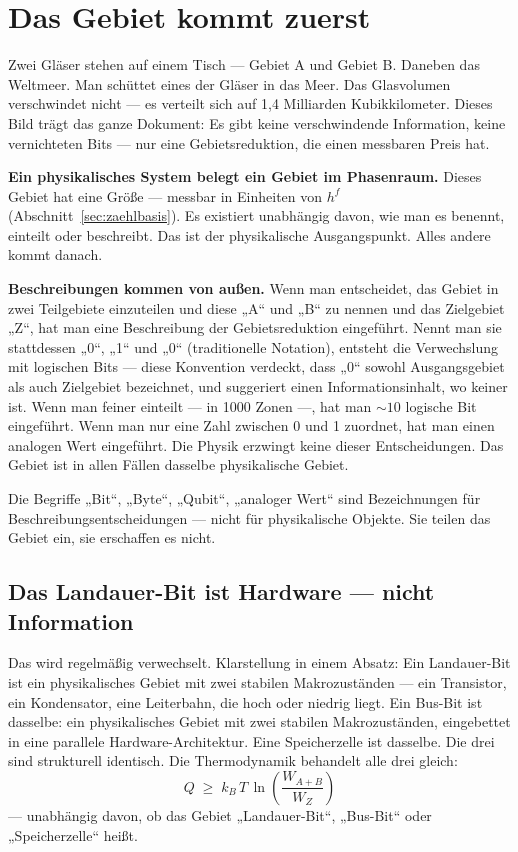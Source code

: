 \bigskip

\section{Das Gebiet kommt zuerst}

Zwei Gläser stehen auf einem Tisch --- Gebiet A und Gebiet B. Daneben das
Weltmeer. Man schüttet eines der Gläser in das Meer. Das Glasvolumen verschwindet
nicht --- es verteilt sich auf 1,4 Milliarden Kubikkilometer. Dieses Bild trägt
das ganze Dokument: Es gibt keine verschwindende Information, keine vernichteten
Bits --- nur eine Gebietsreduktion, die einen messbaren Preis hat.

\LS \textbf{Ein physikalisches System belegt ein Gebiet im Phasenraum.} Dieses
Gebiet hat eine Größe --- messbar in Einheiten von $h^f$ (Abschnitt~\ref{sec:zaehlbasis}).
Es existiert unabhängig davon, wie man es benennt, einteilt oder beschreibt. Das
ist der physikalische Ausgangspunkt. Alles andere kommt danach.

\LB \textbf{Beschreibungen kommen von außen.} Wenn man entscheidet, das Gebiet in
zwei Teilgebiete einzuteilen und diese „A“ und „B“ zu nennen und das Zielgebiet
„Z“, hat man eine Beschreibung der Gebietsreduktion eingeführt. Nennt man sie
stattdessen „0“, „1“ und „0“ (traditionelle Notation), entsteht die Verwechslung
mit logischen Bits --- diese Konvention verdeckt, dass „0“ sowohl Ausgangsgebiet
als auch Zielgebiet bezeichnet, und suggeriert einen Informationsinhalt, wo keiner
ist. Wenn man feiner einteilt --- in 1000 Zonen ---, hat man ${\sim}10$ logische
Bit eingeführt. Wenn man nur eine Zahl zwischen 0 und 1 zuordnet, hat man einen
analogen Wert eingeführt. Die Physik erzwingt keine dieser Entscheidungen. Das
Gebiet ist in allen Fällen dasselbe physikalische Gebiet.

Die Begriffe „Bit“, „Byte“, „Qubit“, „analoger Wert“ sind Bezeichnungen für
Beschreibungsentscheidungen --- nicht für physikalische Objekte. Sie teilen das
Gebiet ein, sie erschaffen es nicht.

\subsection{Das Landauer-Bit ist Hardware --- nicht Information}

\LB Das wird regelmäßig verwechselt. Klarstellung in einem Absatz: Ein
Landauer-Bit ist ein physikalisches Gebiet mit zwei stabilen Makrozuständen ---
ein Transistor, ein Kondensator, eine Leiterbahn, die hoch oder niedrig liegt. Ein
Bus-Bit ist dasselbe: ein physikalisches Gebiet mit zwei stabilen Makrozuständen,
eingebettet in eine parallele Hardware-Architektur. Eine Speicherzelle ist
dasselbe. Die drei sind strukturell identisch. Die Thermodynamik behandelt alle
drei gleich:
\[
  Q \;\ge\; k_B\,T\,\ln\!\left(\frac{W_{A+B}}{W_Z}\right)
\]
--- unabhängig davon, ob das Gebiet „Landauer-Bit“, „Bus-Bit“ oder
„Speicherzelle“ heißt.

